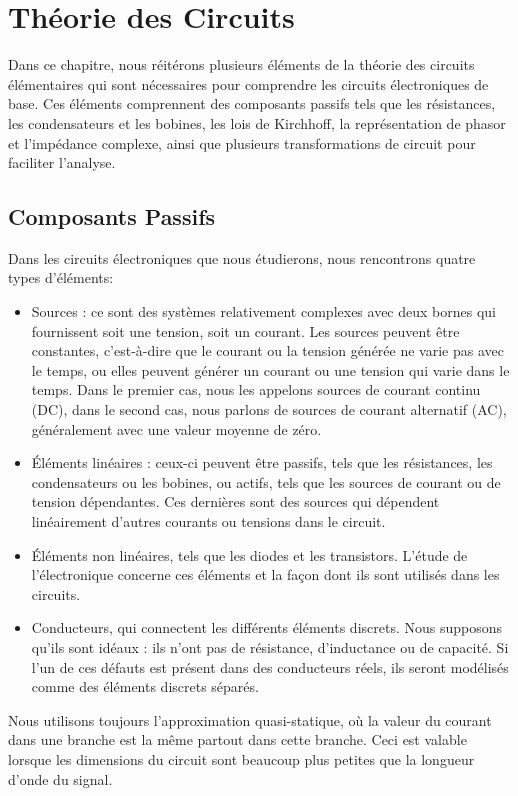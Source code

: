 \chapter{Théorie des Circuits}

Dans ce chapitre, nous réitérons plusieurs éléments de la théorie des circuits élémentaires qui sont nécessaires pour comprendre les circuits électroniques de base. Ces éléments comprennent des composants passifs tels que les résistances, les condensateurs et les bobines, les lois de Kirchhoff, la représentation de phasor et l'impédance complexe, ainsi que plusieurs transformations de circuit pour faciliter l'analyse.

\section{Composants Passifs}
Dans les circuits électroniques que nous étudierons, nous rencontrons quatre types d'éléments:
\begin{itemize}
	\item Sources : ce sont des systèmes relativement complexes avec deux bornes qui fournissent soit une tension, soit un courant. Les sources peuvent être constantes, c'est-à-dire que le courant ou la tension générée ne varie pas avec le temps, ou elles peuvent générer un courant ou une tension qui varie dans le temps. Dans le premier cas, nous les appelons sources de courant continu (DC), dans le second cas, nous parlons de sources de courant alternatif (AC), généralement avec une valeur moyenne de zéro.
	\item Éléments linéaires : ceux-ci peuvent être passifs, tels que les résistances, les condensateurs ou les bobines, ou actifs, tels que les sources de courant ou de tension dépendantes. Ces dernières sont des sources qui dépendent linéairement d'autres courants ou tensions dans le circuit.
	\item Éléments non linéaires, tels que les diodes et les transistors. L'étude de l'électronique concerne ces éléments et la façon dont ils sont utilisés dans les circuits.
	\item Conducteurs, qui connectent les différents éléments discrets. Nous supposons qu'ils sont idéaux : ils n'ont pas de résistance, d'inductance ou de capacité. Si l'un de ces défauts est présent dans des conducteurs réels, ils seront modélisés comme des éléments discrets séparés.
\end{itemize}
Nous utilisons toujours l'approximation quasi-statique, où la valeur du courant dans une branche est la même partout dans cette branche. Ceci est valable lorsque les dimensions du circuit sont beaucoup plus petites que la longueur d'onde du signal.



